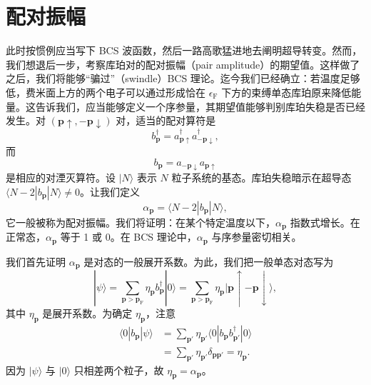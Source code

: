 \section{配对振幅}

此时按惯例应当写下 BCS 波函数，然后一路高歌猛进地去阐明超导转变。然而，我们想退后一步，考察库珀对的配对振幅（pair amplitude）的期望值。这样做了之后，我们将能够“骗过”（swindle）BCS 理论。迄今我们已经确立：若温度足够低，费米面上方的两个电子可以通过形成恰在 $\epsilon_{\mathrm F}$ 下方的束缚单态库珀原来降低能量。这告诉我们，应当能够定义一个序参量，其期望值能够判别库珀失稳是否已经发生。对 $(\mathbf p\uparrow,-\mathbf p\downarrow)$ 对，适当的配对算符是
\begin{equation*}
b^\dagger_{\mathbf p}=a^\dagger_{\mathbf p\uparrow}a^\dagger_{-\mathbf p\downarrow}, \tag{12.122}
\end{equation*}
而
\begin{equation*}
b_{\mathbf p}=a_{-\mathbf p\downarrow}a_{\mathbf p\uparrow} \tag{12.123}
\end{equation*}
是相应的对湮灭算符。设 $|N\rangle$ 表示 $N$ 粒子系统的基态。库珀失稳暗示在超导态 $\langle N-2|b_{\mathbf p}|N\rangle\neq 0$。让我们定义
\begin{equation*}
\alpha_{\mathbf p}=\langle N-2|b_{\mathbf p}|N\rangle, \tag{12.124}
\end{equation*}
它一般被称为配对振幅。我们将证明：在某个特定温度以下，$\alpha_{\mathbf p}$ 指数式增长。在正常态，$\alpha_{\mathbf p}$ 等于 1 或 0。在 BCS 理论中，$\alpha_{\mathbf p}$ 与序参量密切相关。

我们首先证明 $\alpha_{\mathbf p}$ 是对态的一般展开系数。为此，我们把一般单态对态写为
\begin{equation*}
|\psi\rangle=\sum_{\mathbf p>\mathbf p_{\mathrm F}}\eta_{\mathbf p}b^\dagger_{\mathbf p}|0\rangle=\sum_{\mathbf p>\mathbf p_{\mathrm F}}\eta_{\mathbf p}|\mathbf p\uparrow-\mathbf p\downarrow\rangle, \tag{12.125}
\end{equation*}
其中 $\eta_{\mathbf p}$ 是展开系数。为确定 $\eta_{\mathbf p}$，注意
\begin{align*}
\langle 0|b_{\mathbf p}|\psi\rangle&=\sum_{\mathbf p'}\eta_{\mathbf p'}\langle 0|b_{\mathbf p}b^\dagger_{\mathbf p'}|0\rangle\\
&=\sum_{\mathbf p'}\eta_{\mathbf p'}\delta_{\mathbf p\mathbf p'}=\eta_{\mathbf p}. \tag{12.126}
\end{align*}
因为 $|\psi\rangle$ 与 $|0\rangle$ 只相差两个粒子，故 $\eta_{\mathbf p}=\alpha_{\mathbf p}$。


